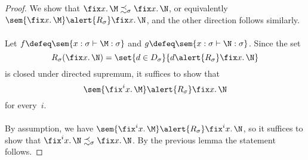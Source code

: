 \begin{frame}
  \begin{proof}
    We show that $\fix x.\, \M \precsim_\sigma \fix x.\, \N$, or
    equivalently~$\sem{\fix x.\, \M} \alert{\mathrel{R_\sigma}} \fix x.\, \N$,
    and the other direction follows similarly. 
    \\~\\
    
    Let $f \defeq \sem{x : \sigma \vdash \M : \sigma}$ and $g \defeq \sem{x :
      \sigma \vdash \N : \sigma}$. Since the set
    \[
      R_\sigma(\fix x.\,\N)
      = \set{ d \in D_\sigma}{ d \alert{\mathrel{R_\sigma}} \fix x.\,\N}
    \]
    is closed under directed supremum, it suffices to show that
    \[
      \sem{\fix^i x.\,\M} \alert{\mathrel{R_\sigma}} \fix x.\,\N
    \]
    for every~$i$.
    \\~\\
    
    By assumption, we have $\sem{\fix^i x.\,\M}\alert{\mathrel{R_\sigma}}
    \fix^i x.\,\N$, so it suffices to show that $\fix^i x.\,\N \precsim_\sigma
    \fix x.\,\N$. By the previous lemma the statement follows. 
  \end{proof}
\end{frame}


